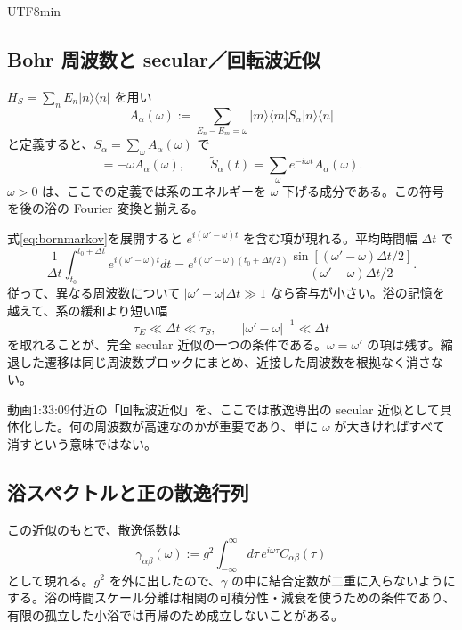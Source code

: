 \documentclass[11pt,a4paper]{article}
\numberwithin{equation}{section}
\newcommand{\ket}[1]{\lvert#1\rangle}
\newcommand{\bra}[1]{\langle#1\rvert}
\begin{document}
\begin{CJK*}{UTF8}{min}
\subsection{Bohr 周波数と secular／回転波近似}
$H_S=\sum_nE_n\ket{n}\bra{n}$ を用い
\begin{equation}
A_\alpha(\omega):=\sum_{E_n-E_m=\omega}
\ket{m}\bra{m}S_\alpha\ket{n}\bra{n}
\label{eq:bohroperator}
\end{equation}
と定義すると、$S_\alpha=\sum_\omega A_\alpha(\omega)$ で
\begin{equation}
[H_S,A_\alpha(\omega)]=-\omega A_\alpha(\omega),
\qquad\widetilde S_\alpha(t)=\sum_\omega e^{-i\omega t}A_\alpha(\omega).
\end{equation}
$\omega>0$ は、ここでの定義では系のエネルギーを $\omega$ 下げる成分である。この符号を後の浴の Fourier 変換と揃える。

式\eqref{eq:bornmarkov}を展開すると $e^{i(\omega'-\omega)t}$ を含む項が現れる。平均時間幅 $\Delta t$ で
\begin{equation}
\frac1{\Delta t}\int_{t_0}^{t_0+\Delta t}
e^{i(\omega'-\omega)t}dt
=e^{i(\omega'-\omega)(t_0+\Delta t/2)}
\frac{\sin[(\omega'-\omega)\Delta t/2]}{(\omega'-\omega)\Delta t/2}.
\label{eq:secular-average}
\end{equation}
従って、異なる周波数について $|\omega'-\omega|\Delta t\gg1$ なら寄与が小さい。浴の記憶を越えて、系の緩和より短い幅
\begin{equation}
\tau_E\ll\Delta t\ll\tau_S,
\qquad |\omega'-\omega|^{-1}\ll\Delta t
\label{eq:secular-window}
\end{equation}
を取れることが、完全 secular 近似の一つの条件である。$\omega=\omega'$ の項は残す。縮退した遷移は同じ周波数ブロックにまとめ、近接した周波数を根拠なく消さない。

動画1:33:09付近の「回転波近似」を、ここでは散逸導出の secular 近似として具体化した。何の周波数が高速なのかが重要であり、単に $\omega$ が大きければすべて消すという意味ではない。

\subsection{浴スペクトルと正の散逸行列}
この近似のもとで、散逸係数は
\begin{equation}
\gamma_{\alpha\beta}(\omega):=g^2\int_{-\infty}^{\infty}
d\tau\,e^{i\omega\tau}C_{\alpha\beta}(\tau)
\label{eq:gamma}
\end{equation}
として現れる。$g^2$ を外に出したので、$\gamma$ の中に結合定数が二重に入らないようにする。浴の時間スケール分離は相関の可積分性・減衰を使うための条件であり、有限の孤立した小浴では再帰のため成立しないことがある。


\end{CJK*}
\end{document}
